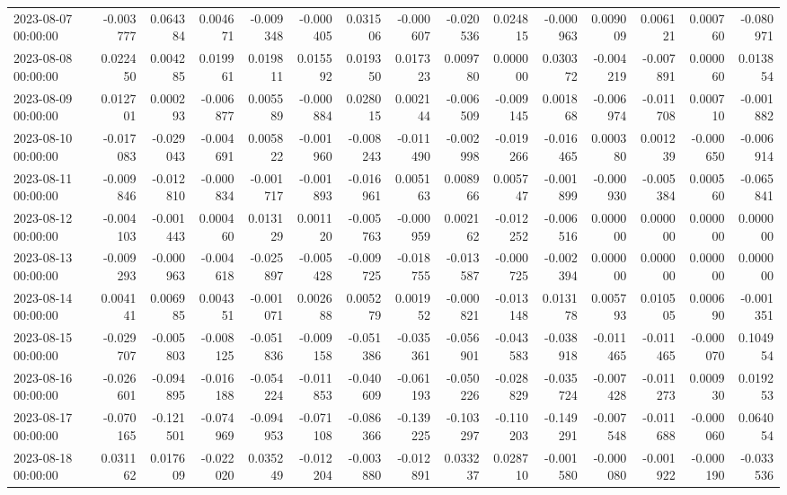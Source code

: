 \begin{tabular}{lrrrrrrrrrrrrrr}
2023-08-07 00:00:00 & -0.003777 & 0.064384 & 0.004671 & -0.009348 & -0.000405 & 0.031506 & -0.000607 & -0.020536 & 0.024815 & -0.000963 & 0.009009 & 0.006121 & 0.000760 & -0.080971 \\
2023-08-08 00:00:00 & 0.022450 & 0.004285 & 0.019961 & 0.019811 & 0.015592 & 0.019350 & 0.017323 & 0.009780 & 0.000000 & 0.030372 & -0.004219 & -0.007891 & 0.000060 & 0.013854 \\
2023-08-09 00:00:00 & 0.012701 & 0.000293 & -0.006877 & 0.005589 & -0.000884 & 0.028015 & 0.002144 & -0.006509 & -0.009145 & 0.001868 & -0.006974 & -0.011708 & 0.000710 & -0.001882 \\
2023-08-10 00:00:00 & -0.017083 & -0.029043 & -0.004691 & 0.005822 & -0.001960 & -0.008243 & -0.011490 & -0.002998 & -0.019266 & -0.016465 & 0.000380 & 0.001239 & -0.000650 & -0.006914 \\
2023-08-11 00:00:00 & -0.009846 & -0.012810 & -0.000834 & -0.001717 & -0.001893 & -0.016961 & 0.005163 & 0.008966 & 0.005747 & -0.001899 & -0.000930 & -0.005384 & 0.000560 & -0.065841 \\
2023-08-12 00:00:00 & -0.004103 & -0.001443 & 0.000460 & 0.013129 & 0.001120 & -0.005763 & -0.000959 & 0.002162 & -0.012252 & -0.006516 & 0.000000 & 0.000000 & 0.000000 & 0.000000 \\
2023-08-13 00:00:00 & -0.009293 & -0.000963 & -0.004618 & -0.025897 & -0.005428 & -0.009725 & -0.018755 & -0.013587 & -0.000725 & -0.002394 & 0.000000 & 0.000000 & 0.000000 & 0.000000 \\
2023-08-14 00:00:00 & 0.004141 & 0.006985 & 0.004351 & -0.001071 & 0.002688 & 0.005279 & 0.001952 & -0.000821 & -0.013148 & 0.013178 & 0.005793 & 0.010505 & 0.000690 & -0.001351 \\
2023-08-15 00:00:00 & -0.029707 & -0.005803 & -0.008125 & -0.051836 & -0.009158 & -0.051386 & -0.035361 & -0.056901 & -0.043583 & -0.038918 & -0.011465 & -0.011465 & -0.000070 & 0.104954 \\
2023-08-16 00:00:00 & -0.026601 & -0.094895 & -0.016188 & -0.054224 & -0.011853 & -0.040609 & -0.061193 & -0.050226 & -0.028829 & -0.035724 & -0.007428 & -0.011273 & 0.000930 & 0.019253 \\
2023-08-17 00:00:00 & -0.070165 & -0.121501 & -0.074969 & -0.094953 & -0.071108 & -0.086366 & -0.139225 & -0.103297 & -0.110203 & -0.149291 & -0.007548 & -0.011688 & -0.000060 & 0.064054 \\
2023-08-18 00:00:00 & 0.031162 & 0.017609 & -0.022020 & 0.035249 & -0.012204 & -0.003880 & -0.012891 & 0.033237 & 0.028710 & -0.001580 & -0.000080 & -0.001922 & -0.000190 & -0.033536 \\

\end{tabular}
